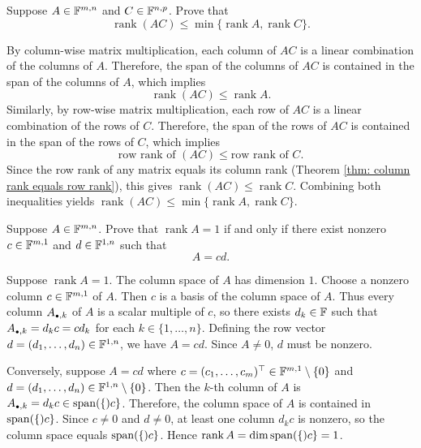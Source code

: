 \begin{xrcs}
  Suppose $A \in \mathbb{F}^{m,n}$ and $C \in \mathbb{F}^{n,p}$. Prove that
  \begin{equation}
    \operatorname{rank}(AC) \leq \min\{\operatorname{rank} A, \operatorname{rank} C\}.
  \end{equation}

  \begin{xprf}
    By column-wise matrix multiplication, each column of $AC$ is a linear combination of the columns of $A$. Therefore, the span of the columns of $AC$ is contained in the span of the columns of $A$, which implies
    \begin{equation}
      \operatorname{rank}(AC) \leq \operatorname{rank} A.
    \end{equation}
    Similarly, by row-wise matrix multiplication, each row of $AC$ is a linear combination of the rows of $C$. Therefore, the span of the rows of $AC$ is contained in the span of the rows of $C$, which implies
    \begin{equation}
      \text{row rank of } (AC) \leq \text{row rank of } C.
    \end{equation}
    Since the row rank of any matrix equals its column rank (Theorem \ref{thm: column rank equals row rank}), this gives $\operatorname{rank}(AC) \leq \operatorname{rank} C$.
    Combining both inequalities yields $\operatorname{rank}(AC) \leq \min\{\operatorname{rank} A, \operatorname{rank} C\}$.
  \end{xprf}
\end{xrcs}
\begin{xrcs}
  Suppose $A \in \mathbb{F}^{m,n}$. Prove that $\operatorname{rank} A = 1$ if and only if there exist nonzero $c \in \mathbb{F}^{m,1}$ and $d \in \mathbb{F}^{1,n}$ such that
  \begin{equation}
    A = c d.
  \end{equation}

\begin{xprf}
  \Rightarrowdirection Suppose $\operatorname{rank} A = 1$. The column space of $A$ has dimension $1$.
  Choose a nonzero column $c \in \mathbb{F}^{m,1}$ of $A$. Then $c$ is a basis of the column space of $A$.
  Thus every column $A_{\mathsmaller{\bullet}, k}$ of $A$ is a scalar multiple of $c$, so there exists $d_k \in \mathbb{F}$ such that $A_{\mathsmaller{\bullet}, k} = d_k c = c d_k$ for each $k \in \{1, \dots, n\}$.
  Defining the row vector $d = (d_1, \dots, d_n) \in \mathbb{F}^{1,n}$, we have $A = c d$.
  Since $A \neq 0$, $d$ must be nonzero.

  \Leftarrowdirection Conversely, suppose $A = cd$ where $c = (c_1, \dots, c_m)^\top \in \mathbb{F}^{m,1} \setminus \{0\}$ and $d = (d_1, \dots, d_n) \in \mathbb{F}^{1,n} \setminus \{0\}$.
  Then the $k$-th column of $A$ is $A_{\mathsmaller{\bullet}, k} = d_k c \in \myspan\{c\}$.
  Therefore, the column space of $A$ is contained in $\operatorname{span} (\{)c\}$.
  Since $c \neq 0$ and $d \neq 0$, at least one column $d_k c$ is nonzero, so the column space equals $\operatorname{span} (\{)c\}$.
  Hence $\operatorname{rank} A = \dim \operatorname{span} (\{)c\} = 1$.
\end{xprf}
\end{xrcs}